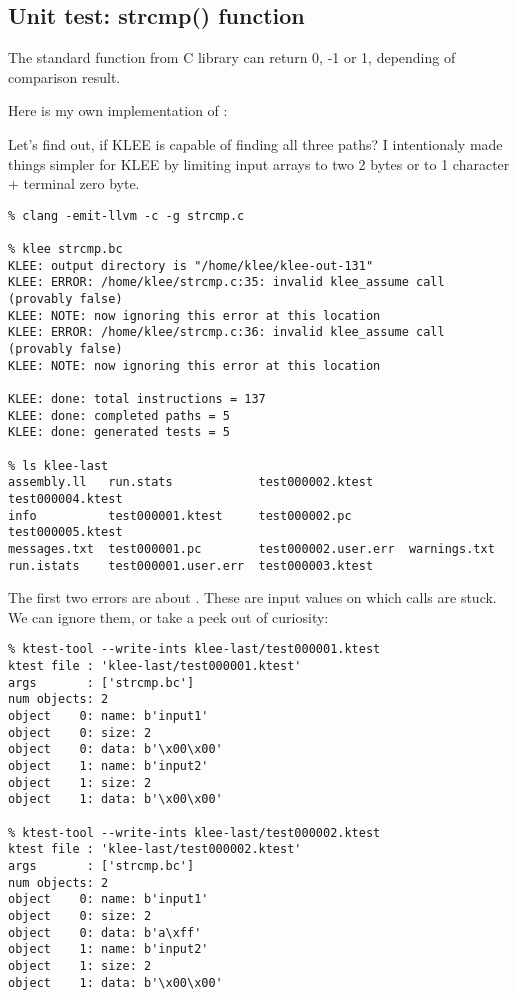 \subsection{Unit test: strcmp() function}

The standard  function from C library can return 0, -1 or 1, depending of comparison result.

Here is my own implementation of :



Let's find out, if KLEE is capable of finding all three paths?
I intentionaly made things simpler for KLEE by limiting input arrays to two 2 bytes or to 1 character + terminal zero byte.

\begin{lstlisting}
% clang -emit-llvm -c -g strcmp.c

% klee strcmp.bc
KLEE: output directory is "/home/klee/klee-out-131"
KLEE: ERROR: /home/klee/strcmp.c:35: invalid klee_assume call (provably false)
KLEE: NOTE: now ignoring this error at this location
KLEE: ERROR: /home/klee/strcmp.c:36: invalid klee_assume call (provably false)
KLEE: NOTE: now ignoring this error at this location

KLEE: done: total instructions = 137
KLEE: done: completed paths = 5
KLEE: done: generated tests = 5

% ls klee-last
assembly.ll   run.stats            test000002.ktest     test000004.ktest
info          test000001.ktest     test000002.pc        test000005.ktest
messages.txt  test000001.pc        test000002.user.err  warnings.txt
run.istats    test000001.user.err  test000003.ktest
\end{lstlisting}

The first two errors are about .
These are input values on which  calls are stuck.
We can ignore them, or take a peek out of curiosity:

\begin{lstlisting}
% ktest-tool --write-ints klee-last/test000001.ktest
ktest file : 'klee-last/test000001.ktest'
args       : ['strcmp.bc']
num objects: 2
object    0: name: b'input1'
object    0: size: 2
object    0: data: b'\x00\x00'
object    1: name: b'input2'
object    1: size: 2
object    1: data: b'\x00\x00'

% ktest-tool --write-ints klee-last/test000002.ktest
ktest file : 'klee-last/test000002.ktest'
args       : ['strcmp.bc']
num objects: 2
object    0: name: b'input1'
object    0: size: 2
object    0: data: b'a\xff'
object    1: name: b'input2'
object    1: size: 2
object    1: data: b'\x00\x00'
\end{lstlisting}

